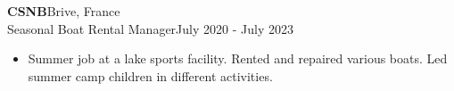 \documentclass[a4paper, 10pt]{article}
\newenvironment{highlights}{
    \begin{itemize}[
        topsep=0.10 cm,
        parsep=0.10 cm,
        partopsep=0pt,
        itemsep=0pt,
        leftmargin=0.4 cm + 10pt
    ]
}{
    \end{itemize}
} %
\begin{document}
    \textbf{CSNB}\hfill Brive, France\\
    Seasonal Boat Rental Manager\hfill July 2020 - July 2023
    \begin{highlights}
        \item Summer job at a lake sports facility. Rented and repaired various boats. Led summer
        camp children in different activities.
    \end{highlights}
    
    
\end{document}
